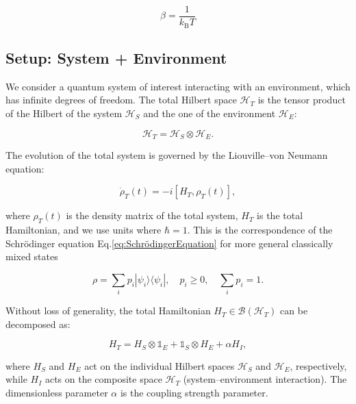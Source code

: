 \begin{equation} \label{eq:ho_beta_definition}
	\beta = \frac{1}{k_{\mathrm{B}} T}
\end{equation}


\subsection{Setup: System + Environment}

\noindent
We consider a quantum system of interest interacting with an environment, which has infinite degrees of freedom. The total Hilbert space $\mathcal{H}_T$ is the tensor product of the Hilbert of the system $\mathcal{H}_S$ and the one of the environment $\mathcal{H}_E$:

\begin{equation}
	\mathcal{H}_T = \mathcal{H}_S \otimes \mathcal{H}_E.
	\label{eq:Total_Hilbert_Space}
\end{equation}

\noindent
The evolution of the total system is governed by the Liouville–von Neumann equation:

\begin{equation}
	\dot{\rho}_T(t) = -i[H_T, \rho_T(t)],
	\label{eq:Von_Neumann_Equation}
\end{equation}

\noindent
where $\rho_T(t)$ is the density matrix of the total system, $H_T$ is the total Hamiltonian, and we use units where $\hbar = 1$. This is the correspondence of the Schrödinger equation Eq.\eqref{eq:SchrödingerEquation} for more general classically mixed states 

\begin{equation}
	\rho = \sum_i p_i |\psi_i\rangle \langle \psi_i|, \quad p_i \geq 0, \quad \sum_i p_i = 1.
\end{equation}

\noindent
Without loss of generality, the total Hamiltonian $H_T \in \mathcal{B}(\mathcal{H}_T)$ can be decomposed as:

\begin{equation}
	H_T = H_S \otimes \mathds{1}_E + \mathds{1}_S \otimes H_E + \alpha H_I,
	\label{eq:Total_Hamiltonian}
\end{equation}

\noindent
where $H_S$ and $H_E$ act on the individual Hilbert spaces $\mathcal{H}_S$ and $\mathcal{H}_E$, respectively, while $H_I$ acts on the composite space $\mathcal{H}_T$ (system--environment interaction). The dimensionless parameter $\alpha$ is the coupling strength parameter.

